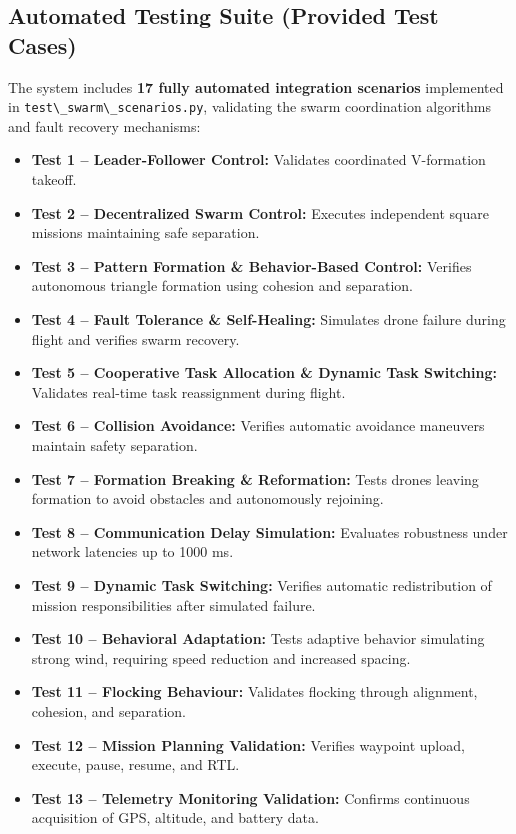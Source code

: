 \documentclass[11pt,a4paper]{article}
\newcommand{\code}[1]{\lstinline[basicstyle=\ttfamily\small,columns=fullflexible]|#1|}
\begin{document}
\subsection{Automated Testing Suite (Provided Test Cases)}
The system includes \textbf{17 fully automated integration scenarios} implemented in \code{test\_swarm\_scenarios.py}, validating the swarm coordination algorithms and fault recovery mechanisms:

\begin{itemize}[leftmargin=1.5em]
    \item \textbf{Test 1 -- Leader-Follower Control:} Validates coordinated V-formation takeoff.
    \item \textbf{Test 2 -- Decentralized Swarm Control:} Executes independent square missions maintaining safe separation.
    \item \textbf{Test 3 -- Pattern Formation \& Behavior-Based Control:} Verifies autonomous triangle formation using cohesion and separation.
    \item \textbf{Test 4 -- Fault Tolerance \& Self-Healing:} Simulates drone failure during flight and verifies swarm recovery.
    \item \textbf{Test 5 -- Cooperative Task Allocation \& Dynamic Task Switching:} Validates real-time task reassignment during flight.
    \item \textbf{Test 6 -- Collision Avoidance:} Verifies automatic avoidance maneuvers maintain safety separation.
    \item \textbf{Test 7 -- Formation Breaking \& Reformation:} Tests drones leaving formation to avoid obstacles and autonomously rejoining.
    \item \textbf{Test 8 -- Communication Delay Simulation:} Evaluates robustness under network latencies up to 1000 ms.
    \item \textbf{Test 9 -- Dynamic Task Switching:} Verifies automatic redistribution of mission responsibilities after simulated failure.
    \item \textbf{Test 10 -- Behavioral Adaptation:} Tests adaptive behavior simulating strong wind, requiring speed reduction and increased spacing.
    \item \textbf{Test 11 -- Flocking Behaviour:} Validates flocking through alignment, cohesion, and separation.
    \item \textbf{Test 12 -- Mission Planning Validation:} Verifies waypoint upload, execute, pause, resume, and RTL.
    \item \textbf{Test 13 -- Telemetry Monitoring Validation:} Confirms continuous acquisition of GPS, altitude, and battery data.

\end{itemize}
\end{document}
